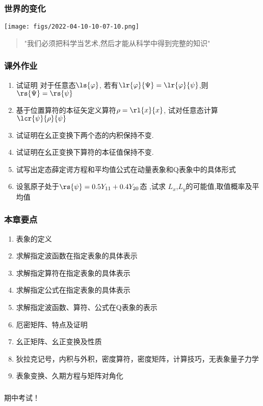 \begin{frame}
      \frametitle{世界的变化}
        \begin{center}
             \texttt{[image: figs/2022-04-10-10-07-10.png]}
        \end{center}   
        \begin{quotation}
            "我们必须把科学当艺术,然后才能从科学中得到完整的知识"  \\
        \end{quotation}  
\end{frame}
\begin{frame}
    \frametitle{课外作业}
    \begin{enumerate}
        \item 试证明 对于任意态$\ls{\varphi}$, 若有$\lr{\varphi}{\Psi}=\lr{\varphi}{\psi} $,则$ \rs{\Psi}=\rs{\psi}$ 
        \item 基于位置算符的本征矢定义算符$\rho=\rl{x}{x}$, 试对任意态计算$\lcr{\psi}{\rho}{\psi}$
        \item 试证明在幺正变换下两个态的内积保持不变.
        \item 试证明在幺正变换下算符的本征值保持不变.
        \item 试写出定态薛定谔方程和平均值公式在动量表象和Q表象中的具体形式
        \item 设氢原子处于$\rs{\psi}=0.5Y_{11}+0.4Y_{20}$态 ,试求 $L_x$,$L_y$的可能值,取值概率及平均值 
    \end{enumerate}
\end{frame}

\begin{frame}[label=current]
    \frametitle{本章要点}
    \begin{enumerate}
      \item 表象的定义
      \item 求解指定波函数在指定表象的具体表示
      \item 求解指定算符在指定表象的具体表示
      \item 求解指定公式在指定表象的具体表示
      \item 求解指定波函数、算符、公式在Q表象的表示
      \item 厄密矩阵、特点及证明
      \item 幺正矩阵、幺正变换及性质
      \item 狄拉克记号，内积与外积，密度算符，密度矩阵，计算技巧，无表象量子力学
      \item 表象变换、久期方程与矩阵对角化
    \end{enumerate}
  
  \end{frame} 
\begin{frame}
    \frametitle{}  
    \centering
    \LARGE \color{red} 期中考试！ \\
\end{frame}